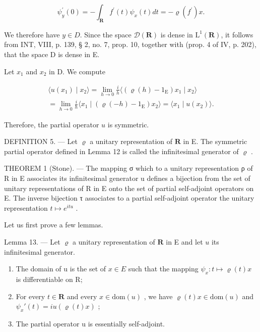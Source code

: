 \[
\psi_ {y} ^ {\prime} (0) = - \int_ {\mathbf {R}} f ^ {\prime} (t) \psi_ {x} (t) d t = - \varrho (f ^ {\prime}) x.
\]

We therefore have \(y \in D\). Since the space \(\mathcal{D}(\mathbf{R})\) is dense in \(\mathrm{L}^{1}(\mathbf{R})\), it follows from INT, VIII, p. 139, § 2, no. 7, prop. 10, together with (prop. 4 of IV, p. 202), that the space D is dense in E.

Let \(x_{1}\) and \(x_{2}\) in D. We compute

\[
\begin{array}{c} \langle u (x _ {1}) \mid x _ {2} \rangle = \lim _ {h \to 0} \frac {i}{h} \langle (\varrho (h) - 1 _ {\mathrm{E}}) x _ {1} \mid x _ {2} \rangle \\ = \lim _ {h \to 0} \frac {i}{h} \langle x _ {1} \mid (\varrho (- h) - 1 _ {\mathrm{E}}) x _ {2} \rangle = \langle x _ {1} \mid u (x _ {2}) \rangle . \end{array}
\]

Therefore, the partial operator \(u\) is symmetric.

DEFINITION 5. --- Let \(\varrho\) a unitary representation of \(\mathbf{R}\) in E. The symmetric partial operator defined in Lemma 12 is called the infinitesimal generator of \(\varrho\) .

THEOREM 1 (Stone). --- The mapping σ which to a unitary representation ρ of R in E associates its infinitesimal generator u defines a bijection from the set of unitary representations of R in E onto the set of partial self-adjoint operators on E. The inverse bijection τ associates to a partial self-adjoint operator the unitary representation \(t \mapsto e^{itu}\) .

Let us first prove a few lemmas.

Lemma 13. --- Let \(\varrho\) a unitary representation of \(\mathbf{R}\) in E and let \(u\) its infinitesimal generator.

\begin{enumerate}
\def\labelenumi{\alph{enumi})}
\item
  The domain of u is the set of \(x \in E\) such that the mapping \(\psi_{x} \colon t \mapsto \varrho(t)x\) is differentiable on R;
\item
  For every \(t \in \mathbf{R}\) and every \(x \in \mathrm{dom}(u)\) , we have \(\varrho(t)x \in \mathrm{dom}(u)\) and \(\psi_x'(t) = i u(\varrho(t)x)\) ;
\item
  The partial operator u is essentially self-adjoint.
\end{enumerate}

